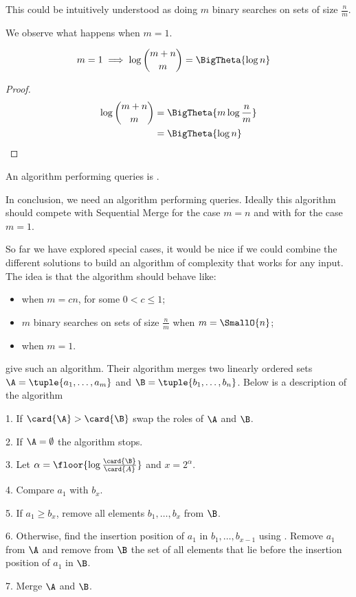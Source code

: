 This could be intuitively understood as doing $m$ binary searches on sets of
size $\frac{n}{m}$.

We observe what happens when $m = 1$.
\begin{lemma}
\begin{align*}
m = 1 &\implies \log\binom{m+n}{m} = \BigTheta{\log n}
\end{align*}
\end{lemma}
\begin{proof}
\begin{align*}
\log\binom{m+n}{m} &= \BigTheta{m \log\frac{n}{m}}\\
&= \BigTheta{\log n}\qedhere
\end{align*}
\end{proof}

An algorithm performing  queries is \binarysearch.

In conclusion, we need an algorithm performing  queries.
Ideally this algorithm should compete with Sequential Merge for the case
$m = n$ and with \binarysearch for the case $m = 1$.

So far we have explored special cases, it would be nice if we could
combine the different solutions to build an algorithm of complexity  that works for any input.
The idea is that the algorithm should behave like:
\begin{itemize}
\item \tapemerge when $m = cn$, for some \(0 < c \le 1\);
\item $m$ binary searches on sets of size $\frac{n}{m}$ when $m = \SmallO{n}$;
\item \binarysearch when \(m = 1\).
\end{itemize}

\citet*{DBLP:journals/siamcomp/HwangL72} give such an algorithm. Their
algorithm merges two linearly ordered sets \(\A = \tuple{a_1,\ldots,a_m}\) and
\(\B = \tuple{b_1,\ldots,b_n}\). Below is a
description of the algorithm
\begin{algorithm}
\item[1.] If \(\card{\A} > \card{\B}\) swap the roles of \(\A\) and \(\B\).
\item[2.] If \(\A = \emptyset\) the algorithm stops.
\item[3.] Let \(\alpha = \floor{\log \frac{\card{\B}}{\card{A}}}\) and \(x = 2^{\alpha}\).
\item[4.] Compare \(a_1\) with \(b_x\).
\item[5.] If \(a_1 \ge b_x\), remove all elements \(b_1,\ldots,b_x\) from \(\B\).
\item[6.] Otherwise, find the insertion position of \(a_1\) in
\(b_{1},\ldots,b_{x-1}\) using \binarysearch. Remove \(a_1\) from \(\A\) and
remove from \(\B\) the set of all elements that lie before the insertion
position of \(a_1\) in \(\B\).
\item[7.] Merge \(\A\) and \(\B\).
\end{algorithm}

